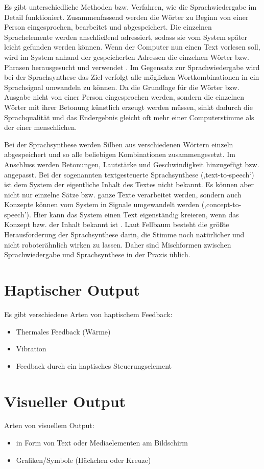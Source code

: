 Es gibt unterschiedliche Methoden bzw. Verfahren, wie die Sprachwiedergabe im Detail funktioniert. Zusammenfassend werden die Wörter zu Beginn von einer Person eingesprochen, bearbeitet und abgespeichert. Die einzelnen Sprachelemente werden anschließend adressiert, sodass sie vom System später leicht gefunden werden können. Wenn der Computer nun einen Text vorlesen soll, wird im System anhand der gespeicherten Adressen die einzelnen Wörter bzw. Phrasen herausgesucht und verwendet \cite{FellbaumSprache}.
\newline \newline
Im Gegensatz zur Sprachwiedergabe wird bei der Sprachsynthese das Ziel verfolgt alle möglichen Wortkombinationen in ein Sprachsignal umwandeln zu können. Da die Grundlage für die Wörter bzw. Ausgabe nicht von einer Person eingesprochen werden, sondern die einzelnen Wörter mit ihrer Betonung künstlich erzeugt werden müssen, sinkt dadurch die Sprachqualität und das Endergebnis gleicht oft mehr einer Computerstimme als der einer menschlichen. 

Bei der Sprachsynthese werden Silben aus verschiedenen Wörtern einzeln abgespeichert und so alle beliebigen Kombinationen zusammengesetzt. Im Anschluss werden Betonungen, Lautstärke und Geschwindigkeit hinzugefügt bzw. angepasst. Bei der sogenannten textgesteuerte Sprachsynthese (‚text-to-speech‘) ist dem System der eigentliche Inhalt des Textes nicht bekannt. Es können aber nicht nur einzelne Sätze bzw. ganze Texte verarbeitet werden, sondern auch Konzepte können vom System in Signale umgewandelt werden (,concept-to-speech'). Hier kann das System einen Text eigenständig kreieren, wenn das Konzept bzw. der Inhalt bekannt ist \cite{FellbaumSprache}.
\newline \newline
Laut Fellbaum \cite{FellbaumSprache} besteht die größte Herausforderung der Sprachsynthese darin, die Stimme noch natürlicher und nicht roboterähnlich wirken zu lassen. Daher sind Mischformen zwischen Sprachwiedergabe und Sprachsynthese in der Praxis üblich. 

\section{Haptischer Output}
Es gibt verschiedene Arten von haptischem Feedback:
\begin{itemize}
      \item Thermales Feedback (Wärme)
      \item Vibration
			\item Feedback durch ein haptisches Steuerungselement
\end{itemize}

\section{Visueller Output}
Arten von visuellem Output:
\begin{itemize}
      \item in Form von Text oder Mediaelementen am Bildschirm
      \item Grafiken/Symbole (Häckchen oder Kreuze)
\end{itemize}




